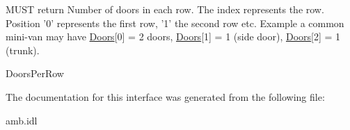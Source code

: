 M\-U\-S\-T return Number of doors in each row. The index represents the row. Position '0' represents the first row, '1' the second row etc. Example a common mini-\/van may have \hyperlink{interfaceVehicle_1_1Doors}{Doors}\mbox{[}0\mbox{]} = 2 doors, \hyperlink{interfaceVehicle_1_1Doors}{Doors}\mbox{[}1\mbox{]} = 1 (side door), \hyperlink{interfaceVehicle_1_1Doors}{Doors}\mbox{[}2\mbox{]} = 1 (trunk). 

Doors\-Per\-Row 

The documentation for this interface was generated from the following file\-:\begin{DoxyCompactItemize}
\item 
amb.\-idl\end{DoxyCompactItemize}
